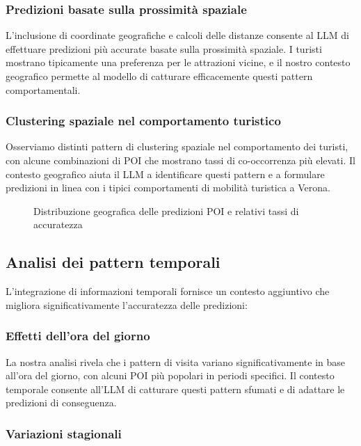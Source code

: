 \subsubsection{Predizioni basate sulla prossimità spaziale}

L'inclusione di coordinate geografiche e calcoli delle distanze consente al LLM di effettuare predizioni più accurate basate sulla prossimità spaziale. I turisti mostrano tipicamente una preferenza per le attrazioni vicine, e il nostro contesto geografico permette al modello di catturare efficacemente questi pattern comportamentali.

\subsubsection{Clustering spaziale nel comportamento turistico}

Osserviamo distinti pattern di clustering spaziale nel comportamento dei turisti, con alcune combinazioni di POI che mostrano tassi di co-occorrenza più elevati. Il contesto geografico aiuta il LLM a identificare questi pattern e a formulare predizioni in linea con i tipici comportamenti di mobilità turistica a Verona.

\begin{figure}[H]
\centering
\caption{Distribuzione geografica delle predizioni POI e relativi tassi di accuratezza}
\label{fig:geographical_analysis}
\end{figure}

\subsection{Analisi dei pattern temporali}

L'integrazione di informazioni temporali fornisce un contesto aggiuntivo che migliora significativamente l'accuratezza delle predizioni:

\subsubsection{Effetti dell'ora del giorno}

La nostra analisi rivela che i pattern di visita variano significativamente in base all'ora del giorno, con alcuni POI più popolari in periodi specifici. Il contesto temporale consente all'LLM di catturare questi pattern sfumati e di adattare le predizioni di conseguenza.

\subsubsection{Variazioni stagionali}

